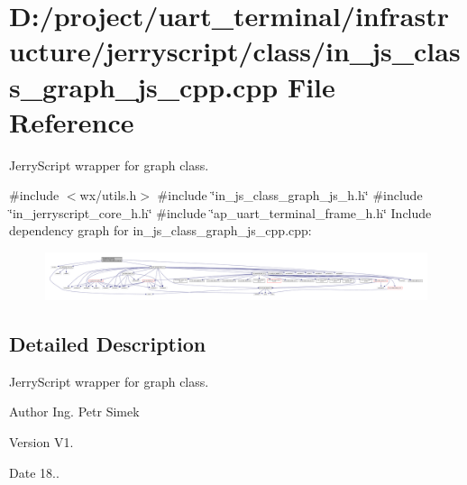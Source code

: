 \section{D\+:/project/uart\+\_\+terminal/infrastructure/jerryscript/class/in\+\_\+js\+\_\+class\+\_\+graph\+\_\+js\+\_\+cpp.cpp File Reference}
\label{in__js__class__graph__js__cpp_8cpp}


Jerry\+Script wrapper for graph class.  


{\ttfamily \#include $<$wx/utils.\+h$>$}\newline
{\ttfamily \#include \char`\"{}in\+\_\+js\+\_\+class\+\_\+graph\+\_\+js\+\_\+h.\+h\char`\"{}}\newline
{\ttfamily \#include \char`\"{}in\+\_\+jerryscript\+\_\+core\+\_\+h.\+h\char`\"{}}\newline
{\ttfamily \#include \char`\"{}ap\+\_\+uart\+\_\+terminal\+\_\+frame\+\_\+h.\+h\char`\"{}}\newline
Include dependency graph for in\+\_\+js\+\_\+class\+\_\+graph\+\_\+js\+\_\+cpp.\+cpp\+:
\nopagebreak
\begin{figure}[H]
\begin{center}
\leavevmode
\includegraphics[width=350pt]{in__js__class__graph__js__cpp_8cpp__incl}
\end{center}
\end{figure}


\subsection{Detailed Description}
Jerry\+Script wrapper for graph class. 

\begin{DoxyAuthor}{Author}
Ing. Petr Simek 
\end{DoxyAuthor}
\begin{DoxyVersion}{Version}
V1. 
\end{DoxyVersion}
\begin{DoxyDate}{Date}
18.. 
\end{DoxyDate}
